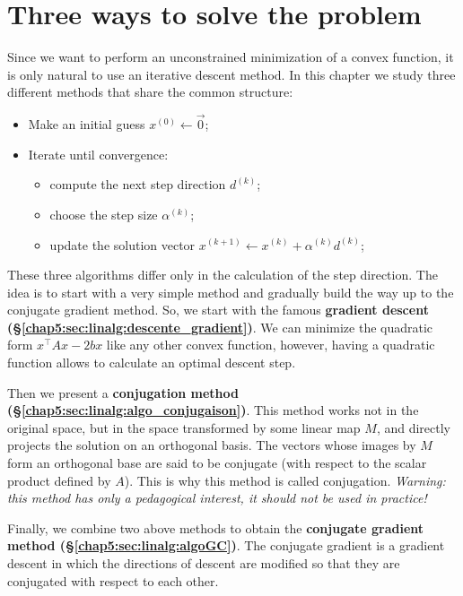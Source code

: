 \documentclass[notitlepage,oneside]{book}
\begin{document}
\section{Three ways to solve the problem}
\label{chap5:sec:linalg:formulations_pb}

Since we want to perform an unconstrained minimization of a convex function, it is only natural to use an iterative descent method.
In this chapter we study three different methods that share the common structure:
\begin{framed}
\begin{itemize}
\item Make an initial guess $x^{(0)} \leftarrow \vec{0} $;
\item Iterate until convergence:
\begin{itemize}
   \item compute the next step direction $d^{(k)}$;
   \item choose the step size $\alpha^{(k)}$;
   \item update the solution vector $x^{(k+1)} \leftarrow  x^{(k)}+\alpha^{(k)} d^{(k)}$;
\end{itemize}
\end{itemize}
\end{framed}

These three algorithms differ only in the calculation of the step direction. The idea is to start with a very simple method and gradually build the way up to the conjugate gradient method.
So, we start with the famous \textbf{gradient descent (\S\ref{chap5:sec:linalg:descente_gradient})}.
We can minimize the quadratic form $x^\top Ax-2bx$ like any other convex function, however, having a quadratic function allows to calculate an optimal descent step.

Then we present a \textbf{conjugation method (\S\ref{chap5:sec:linalg:algo_conjugaison})}.
This method works not in the original space, but in the space transformed by some linear map $M$, and directly projects the solution on an orthogonal basis.
The vectors whose images by $M$ form an orthogonal base are said to be conjugate (with respect to the scalar product defined by $A$).
This is why this method is called conjugation. \textit{Warning: this method has only a pedagogical interest, it should not be used in practice!}

Finally, we combine two above methods to obtain the \textbf{conjugate gradient method (\S\ref{chap5:sec:linalg:algoGC})}.
The conjugate gradient is a gradient descent in which the directions of descent are modified so that they are conjugated with respect to each other.
\end{document}
